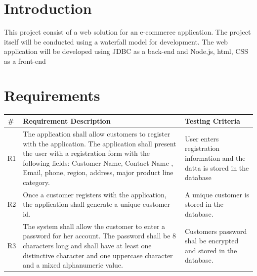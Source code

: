 \documentclass[12pt]{article}
\begin{document}
\begin{myspace}{1.7}
        
\section*{Introduction}  
This project consist of a web solution for an e-commerce application. The project itself will be conducted using a waterfall model \cite{waterfall} for development. The web application will be developed
using JDBC as a back-end and Node.js, html, CSS as a front-end

%
%
\pagebreak
\section*{Requirements}  



%
%

\begin{tabular}{|l| l |l}
  \hline
  \# & Requirement Description & Testing Criteria \\
  \hline
  R1 & The application shall allow customers to register with the application. The application shall
  present the user with a registration form with the following fields: Customer Name, Contact Name
  , Email, phone, region, address, major product line category. & User enters registration information
  and the datta is stored in the database \\
  \hline
  R2 & Once a customer registers with the application, the application shall generate a unique customer id. &
  A unique customer is stored in the database.\\
  \hline
  R3 & The system shall allow the customer to enter a password for her account. The password shall be 8
  characters long and shall have at least one distinctive character and one uppercase character and a mixed alphanumeric value. & Customers password shal be encrypted and stored in the database.\\
  \hline
\end{tabular}
\pagebreak

\end{myspace}
\end{document}
